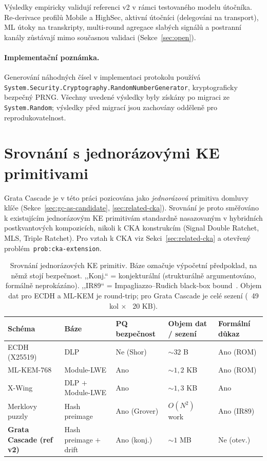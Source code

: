 \documentclass[11pt,a4paper]{article}
\begin{document}
Výsledky empiricky validují referenci v2 v rámci testovaného modelu útočníka. Re-derivace profilů Mobile a HighSec, aktivní útočníci (delegováni na transport), ML útoky na transkripty, multi-round agregace slabých signálů a postranní kanály zůstávají mimo současnou validaci (Sekce~\ref{sec:open}).

\paragraph{Implementační poznámka.} Generování náhodných čísel v implementaci protokolu používá \texttt{System.Security.Cryptography.RandomNumberGenerator}, kryptograficky bezpečný PRNG. Všechny uvedené výsledky byly získány po migraci ze \texttt{System.Random}; výsledky před migrací jsou zachovány odděleně pro reprodukovatelnost.

\section{Srovnání s jednorázovými KE primitivami}\label{sec:comparison}

Grata Cascade je v této práci pozicována jako \emph{jednorázová} primitiva domluvy klíče (Sekce~\ref{sec:gc-as-candidate}, \ref{sec:related-cka}). Srovnání je proto směřováno k existujícím jednorázovým KE primitivám standardně nasazovaným v hybridních postkvantových kompozicích, nikoli k CKA konstrukcím (Signal Double Ratchet, MLS, Triple Ratchet). Pro vztah k CKA viz Sekci~\ref{sec:related-cka} a otevřený problém~\texttt{prob:cka-extension}.

\begin{table}[ht]
\centering
\small
\begin{tabular}{lllll}
\toprule
Schéma & Báze & PQ bezpečnost & Objem dat / sezení & Formální důkaz \\
\midrule
ECDH (X25519) & DLP & Ne (Shor) & $\sim 32$ B & Ano (ROM) \\
ML-KEM-768 & Module-LWE & Ano & $\sim 1{,}2$ KB & Ano (ROM) \\
X-Wing~\cite{xwing} & DLP $+$ Module-LWE & Ano & $\sim 1{,}3$ KB & Ano \\
Merklovy puzzly~\cite{Merkle1978} & Hash preimage & Ano (Grover) & $O(N^2)$ work & Ano (IR89) \\
\textbf{Grata Cascade (ref v2)} & Hash preimage $+$ drift & Ano (konj.) & $\sim 1$ MB & Ne (otev.) \\
\bottomrule
\end{tabular}
\caption{Srovnání jednorázových KE primitiv. Báze označuje výpočetní předpoklad, na němž stojí bezpečnost. ,,Konj.`` = konjekturální (strukturálně argumentováno, formálně neprokázáno). ,,IR89`` = Impagliazzo--Rudich black-box bound~\cite{IR1989}. Objem dat pro ECDH a ML-KEM je round-trip; pro Grata Cascade je celé sezení (~49 kol $\times$ ~20 KB).}
\label{tab:comparison}
\end{table}
\end{document}
